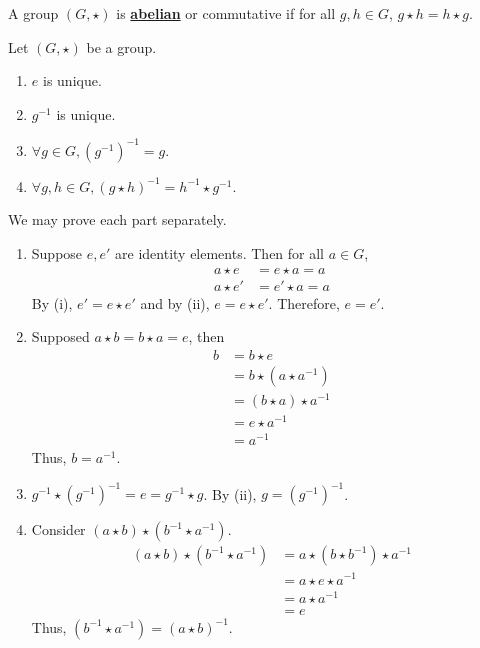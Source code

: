 \documentclass[11pt,letterpaper,boxed]{hmcpset}
\newcommand{\define}[1]{\underline{\textbf{#1}}}
\newcommand{\pn}[1]{\left( #1 \right)}
\theoremstyle{definition}
\begin{document}
\begin{defi}
    A group $(G,\star)$ is \define{abelian} or commutative if for all $g,h\in G$, $g\star h=h\star g$.
\end{defi}

\begin{thm}
    Let $(G,\star)$ be a group.
    \begin{enumerate}
        \item $e$ is unique.
        \item $g^{-1}$ is unique.
        \item $\forall g\in G, \pn{g^{-1}}^{-1}=g$.
        \item $\forall g,h\in G, (g\star h)^{-1}=h^{-1}\star g^{-1}$.
    \end{enumerate}
\end{thm}

\begin{pf}\begin{samepage}
    We may prove each part separately.
    \begin{enumerate}
        \item Suppose $e,e'$ are identity elements. Then for all $a\in G$,
            \begin{align*}
                a\star e&=e\star a=a\tag*{(i)}\\
                a\star e'&=e'\star a=a\tag*{(ii)}
            \end{align*}
            By (i), $e'=e\star e'$ and by (ii), $e=e\star e'$. Therefore, $e=e'$.
        \item Supposed $a\star b=b\star a=e$, then
            \begin{align*}
                b&=b\star e\\
                 &=b\star(a\star a^{-1})\\
                 &=(b\star a)\star a^{-1}\\
                 &=e\star a^{-1}\\
                 &=a^{-1}
            \end{align*}
            Thus, $b=a^{-1}$.
        \item $g^{-1}\star \pn{g^{-1}}^{-1}=e=g^{-1}\star g$. By (ii), $g=\pn{g^{-1}}^{-1}$.
        \item Consider $(a\star b)\star(b^{-1}\star a^{-1})$.
            \begin{align*}
                (a\star b)\star(b^{-1}\star a^{-1})&=a\star(b\star b^{-1})\star a^{-1}\\
                                                   &=a\star e\star a^{-1}\\
                                                   &=a\star a^{-1}\\
                                                   &=e
            \end{align*}
            Thus, $(b^{-1}\star a^{-1})=(a\star b)^{-1}$.
    \end{enumerate}
\end{samepage}\end{pf}
\end{document}
